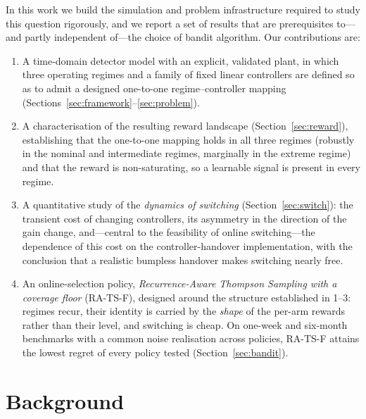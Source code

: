 \documentclass[11pt,a4paper]{article}
\begin{document}
In this work we build the simulation and problem infrastructure required to
study this question rigorously, and we report a set of results that are
prerequisites to---and partly independent of---the choice of bandit algorithm.
Our contributions are:
\begin{enumerate}
  \item A time-domain detector model with an explicit, validated plant, in which
  three operating regimes and a family of fixed linear controllers are defined
  so as to admit a designed one-to-one regime--controller mapping
  (Sections~\ref{sec:framework}--\ref{sec:problem}).
  \item A characterisation of the resulting reward landscape
  (Section~\ref{sec:reward}), establishing that the one-to-one mapping holds in
  all three regimes (robustly in the nominal and intermediate regimes, marginally
  in the extreme regime) and that the reward is non-saturating, so a learnable
  signal is present in every regime.
  \item A quantitative study of the \emph{dynamics of switching}
  (Section~\ref{sec:switch}): the transient cost of changing controllers, its
  asymmetry in the direction of the gain change, and---central to the
  feasibility of online switching---the dependence of this cost on the
  controller-handover implementation, with the conclusion that a realistic
  bumpless handover makes switching nearly free.
  \item An online-selection policy, \emph{Recurrence-Aware Thompson Sampling
  with a coverage floor} (RA-TS-F), designed around the structure established in
  1--3: regimes recur, their identity is carried by the \emph{shape} of the
  per-arm rewards rather than their level, and switching is cheap. On one-week
  and six-month benchmarks with a common noise realisation across policies,
  RA-TS-F attains the lowest regret of every policy tested
  (Section~\ref{sec:bandit}).
\end{enumerate}

\section{Background}\label{sec:background}
\end{document}
